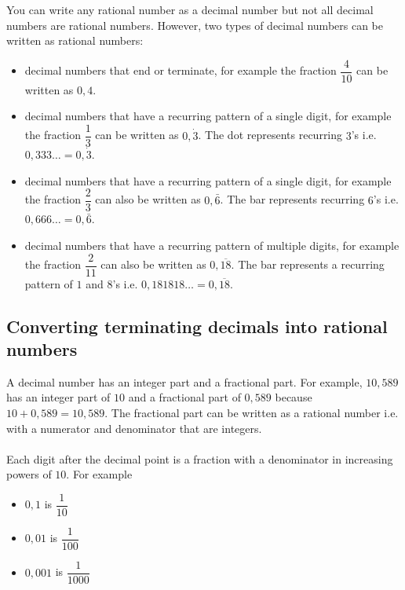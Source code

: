 You can write any rational number as a decimal number but not all decimal numbers are rational numbers. However, two types of decimal numbers can be written as rational numbers:\par 
\begin{itemize}
\item decimal numbers that end or terminate, for example the fraction $\dfrac{4}{10}$ can be written as $0,4$.
\item decimal numbers that have a recurring pattern of a single digit, for example the fraction $\dfrac{1}{3}$ can be written as 
$0,\dot{3}$. 
The dot represents recurring $3$'s i.e.
$0,333\ldots=0,\dot{3}$.
\item decimal numbers that have a recurring pattern of a single digit, for example the fraction $\dfrac{2}{3}$ can also be written as 
$0,\bar{6}$. 
The bar represents recurring $6$'s i.e.
$0,666\ldots=0,\bar{6}$.
\item decimal numbers that have a recurring pattern of multiple digits, for example the fraction $\dfrac{2}{11}$ can also be written as 
$0,\overline{18}$. 
The bar represents a recurring pattern of $1$ and $8$'s i.e.
$0,181818\ldots=0,\overline{18}$.
\end{itemize}





\subsection{Converting terminating decimals into rational numbers}

A decimal number has an integer part and a fractional part. For example, $10,589$ has an integer part of $10$ and a fractional part of $0,589$ because $10+0,589=10,589$. The fractional part can be written as a rational number i.e. with a numerator and denominator that are integers. \\
\\
Each digit after the decimal point is a fraction with a denominator in increasing powers of $10$. For example 
\begin{itemize}
 \item $0,1$ is $\dfrac{1}{10}$
\item $0,01$ is $\dfrac{1}{100}$
\item $0,001$ is $\dfrac{1}{1000}$
\end{itemize}

